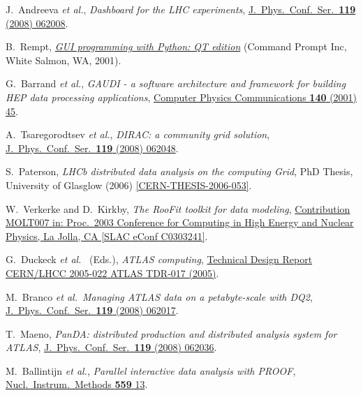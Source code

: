 \documentclass{elsart}
\def\etal {\textit{et al.}}
\begin{document}
\begin{thebibliography}{00}
 J.~Andreeva \etal,
\textit{Dashboard for the LHC experiments},
\href{http://dx.doi.org/10.1088/1742-6596/119/6/062008}
{J.\ Phys.\ Conf.\ Ser.\ \textbf{119} (2008) 062008}.

 B.~Rempt,
\href{http://www.commandprompt.com/community/pyqt/}
{\textit{GUI programming with Python: QT edition}}
(Command Prompt Inc, White Salmon, WA, 2001).

 G.~Barrand \etal,
\textit{GAUDI - a software architecture and framework for building HEP
data processing applications},
\href{http://dx.doi.org/10.1016/S0010-4655(01)00254-5}
{Computer Physics Communications \textbf{140} (2001) 45}.

 A.~Tsaregorodtsev \etal,
\textit{DIRAC: a community grid solution},
\href{http://dx.doi.org/10.1088/1742-6596/119/6/062048}
{J.\ Phys.\ Conf.\ Ser.\ \textbf{119} (2008) 062048}.

 S.~Paterson,
\textit{LHCb distributed data analysis on the computing Grid},
PhD Thesis, University of Glasglow (2006)
\href{http://cdsweb.cern.ch/record/995676/}
{[CERN-THESIS-2006-053]}.

 W.~Verkerke and D.~Kirkby,
\textit{The RooFit toolkit for data modeling},
\href{http://www.slac.stanford.edu/econf/C0303241/proc/papers/MOLT007.PDF}
{Contribution MOLT007 in:
Proc.\ 2003 Conference for Computing in High Energy and Nuclear Physics,
La Jolla, CA [SLAC eConf C0303241]}.

 G.~Duckeck \etal~ (Eds.),
\textit{ATLAS computing},
\href{http://cdsweb.cern.ch/record/837738}
{Technical Design Report CERN/LHCC 2005-022 ATLAS TDR-017 (2005)}.

 M.~Branco \etal\,
\textit{Managing ATLAS data on a petabyte-scale with DQ2},
\href{http://dx.doi.org/10.1088/1742-6596/119/6/062017}
{J.~Phys.\ Conf.\ Ser.\ \textbf{119} (2008) 062017}.

 T.~Maeno,
\textit{PanDA: distributed production and distributed analysis system for
ATLAS},
\href{http://dx.doi.org/10.1088/1742-6596/119/6/062036}
{J.~Phys.\ Conf.\ Ser.\ \textbf{119} (2008) 062036}.

 M.~Ballintijn \etal,
\textit{Parallel interactive data analysis with PROOF},
\href{http://dx.doi.org/10.1016/j.nima.2005.11.100}
{Nucl.\ Instrum.\ Methods \textbf{559} 13}.


\end{thebibliography}
\end{document}
